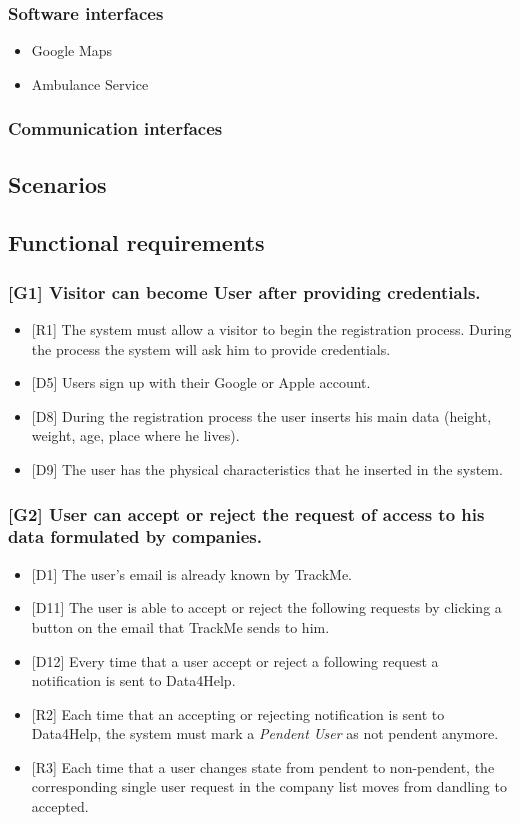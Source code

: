 \documentclass{article}
\begin{document}
\subsubsection{Software interfaces}
\begin{itemize}
	\item Google Maps
	\item Ambulance Service
\end{itemize}
\subsubsection{Communication interfaces}
\subsection{Scenarios}
\subsection{Functional requirements}
\subsubsection{[G1] Visitor can become User after providing credentials.}
\begin{itemize}
\item {[R1]} The system must allow a visitor to begin the registration process. During the process the system will ask him to provide credentials.
\item {[D5]} Users sign up with their Google or Apple account.
\item {[D8]} During the registration process the user inserts his main data (height, weight, age, place where he lives).
\item {[D9]} The user has the physical characteristics that he inserted in the system.
\end{itemize}
\subsubsection{[G2] User can accept or reject the request of access to his data formulated by companies.}
\begin{itemize}
\item {[D1]} The user's email is already known by TrackMe.
\item {[D11]} The user is able to accept or reject the following requests by clicking a button on the email that TrackMe sends to him.
\item {[D12]} Every time that a user accept or reject a following request a notification is sent to Data4Help.
\item {[R2]} Each time that an accepting or rejecting notification is sent to Data4Help, the system must mark a \emph{Pendent User} as not pendent anymore.
\item {[R3]} Each time that a user changes state from pendent to non-pendent, the corresponding single user request in the company list moves from dandling to accepted.
\end{itemize}
\end{document}
